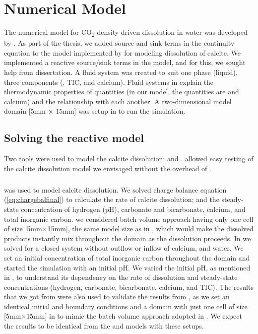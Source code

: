 \chapter{Numerical Model}\label{chapter:numericalmodel}
\thispagestyle{empty}

The numerical model for CO\textsubscript{2} density-driven dissolution in water was developed by 
\citet{Class2020}. As part of the thesis, we added source and sink terms in the continuity equation 
to the  model implemented by \citet{Class2020} for modeling dissolution of calcite. We implemented a 
reactive source/sink terms in the model, and for this, we sought help from \citet{hommel2016modeling} dissertation. 
A fluid system was created to suit one phase (liquid), three components (, TIC, and calcium). 
Fluid systems in \DuMuX explain the thermodynamic properties of quantities (in our model, the quantities are 
 and calcium) and the relationship with each another. A two-dimensional model domain [5mm $\times$ 15mm] 
was setup in \DuMuX to run the simulation.

\section{Solving the reactive model}
Two tools were used to model the calcite dissolution: \MATLAB and \DuMuX. \MATLAB allowed easy testing of the 
calcite dissolution model we envisaged without the overhead of \DuMuX.

\paragraph*{\MATLAB} was used to model calcite dissolution. We solved charge balance equation (\ref{eq:chargebalfinal}) 
to calculate the rate of calcite dissolution; and the steady-state concentration of hydrogen (pH), carbonate and bicarbonate, 
calcium, and total inorganic carbon. we considered batch volume approach having only one cell of size [5mm$\times$15mm], 
the same model size as in \DuMuX , which would make the dissolved products instantly mix throughout the domain as 
the dissolution proceeds. In \MATLAB we solved for a closed system without outflow or inflow of calcium,  and water. 
We set an initial concentration of total inorganic carbon throughout the domain and started the simulation with an initial pH. 
We varied the initial pH, as mentioned in , to understand its dependency on the rate of dissolution and 
steady-state concentrations (hydrogen, carbonate, bicarbonate, calcium, and TIC). The results that we got from \MATLAB were 
also used to validate the results from \DuMuX, as we set an identical initial and boundary conditions and a domain with just 
one cell of size [5mm$\times$15mm] in \DuMuX to mimic the batch volume approach adopted in \MATLAB. We expect the results 
to be identical from the \MATLAB and \DuMuX models with these setups. \\

